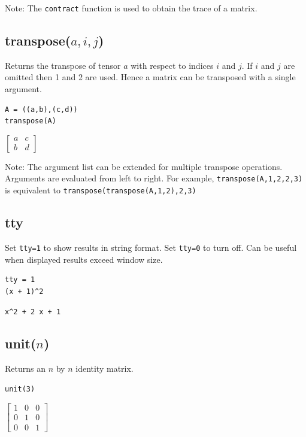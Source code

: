 \documentclass[12pt]{article}
\begin{document}
Note:
The
\verb$contract$
function is used to obtain the trace of a matrix.

\subsection*{transpose($a,i,j$)}

Returns the transpose of tensor $a$ with respect to indices $i$ and $j$.
If $i$ and $j$ are omitted then 1 and 2 are used.
Hence a matrix can be transposed with a single argument.

{\color{blue}
\begin{verbatim}
A = ((a,b),(c,d))
transpose(A)
\end{verbatim}
}

$\displaystyle
\begin{bmatrix}
a & c
\\[1ex]
b & d
\end{bmatrix}
$

\bigskip
Note:
The argument list can be extended for multiple transpose operations.
Arguments are evaluated from left to right.
For example,
\verb$transpose(A,1,2,2,3)$
is equivalent to
\verb$transpose(transpose(A,1,2),2,3)$

\subsection*{tty}

Set \verb$tty=1$ to show results in string format.
Set \verb$tty=0$ to turn off.
Can be useful when displayed results exceed window size.

{\color{blue}
\begin{verbatim}
tty = 1
(x + 1)^2
\end{verbatim}
}

\verb$x^2 + 2 x + 1$

\subsection*{unit($n$)}

Returns an $n$ by $n$ identity matrix.

{\color{blue}
\begin{verbatim}
unit(3)
\end{verbatim}
}

$\displaystyle
\begin{bmatrix}
1 & 0 & 0
\\[1ex]
0 & 1 & 0
\\[1ex]
0 & 0 & 1
\end{bmatrix}
$
\end{document}
